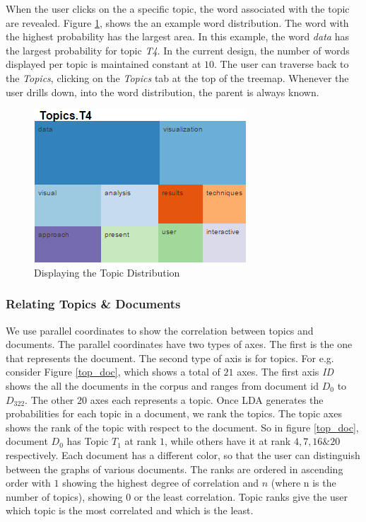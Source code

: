 \documentclass[10pt,journal,compsoc]{IEEEtran}
\begin{document}
When the user clicks on the a specific topic, the word associated with the topic are revealed. Figure \ref{top_details}, shows the an example word distribution. The word with the highest probability has the largest area. In this example, the word \textit{data} has the largest probability for topic \textit{T4}. In the current design, the number of words displayed per topic is maintained constant at $10$. The user can traverse back to the \textit{Topics}, clicking on the \textit{Topics} tab at the top of the treemap. Whenever the user drills down, into the word distribution, the parent is always known.

\begin{figure}[!h]
\centering
\includegraphics[scale=0.75]{topic_details}
\caption{Displaying the Topic Distribution}
\label{top_details}
\end{figure}

\subsubsection{Relating Topics \& Documents}
We use parallel coordinates to show the correlation between topics and documents. The parallel coordinates have two types of axes. The first is the one that represents the document. The second type of axis is for topics. For e.g. consider Figure \ref{top_doc}, which shows a total of $21$ axes. The first axis \textit{ID} shows the all the documents in the corpus and ranges from document id $D_0$ to $D_322$. The other $20$ axes each represents a topic. Once LDA generates the probabilities for each topic in a document, we rank the topics. The topic axes shows the rank of the topic with respect to the document. So in figure \ref{top_doc}, document $D_0$ has Topic $T_1$ at rank $1$, while others have it at rank $4, 7, 16 \& 20$ respectively. Each document has a different color, so that the user can distinguish between the graphs of various documents. The ranks are ordered in ascending order with $1$ showing the highest degree of correlation and $n$ (where n is the number of topics), showing $0$ or the least correlation. Topic ranks give the user which topic is the most correlated and which is the least.
\end{document}
